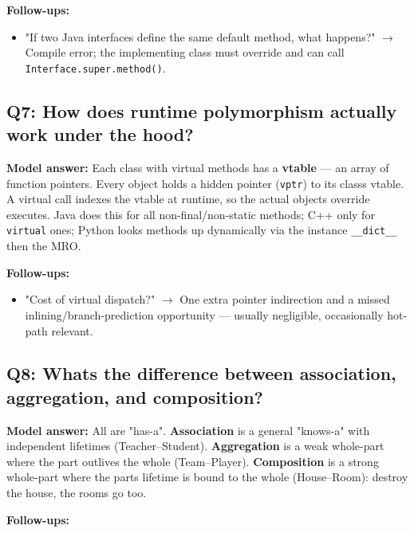 \documentclass[11pt]{article}
\providecommand{\tightlist}{\setlength{\itemsep}{1pt}\setlength{\parskip}{0pt}}
\begin{document}
\textbf{Follow-ups:}

\begin{itemize}
\tightlist
\item
  "If two Java interfaces define the same default method, what happens?" \(\rightarrow\) Compile error; the implementing class must override and can call \texttt{Interface.super.method()}.
\end{itemize}

\subsection{Q7: How does runtime polymorphism actually work under the hood?}\label{q7-how-does-runtime-polymorphism-actually-work-under-the-hood}

\textbf{Model answer:} Each class with virtual methods has a \textbf{vtable} --- an array of function pointers. Every object holds a hidden pointer (\texttt{vptr}) to its class\textquotesingle s vtable. A virtual call indexes the vtable at runtime, so the actual object\textquotesingle s override executes. Java does this for all non-final/non-static methods; C++ only for \texttt{virtual} ones; Python looks methods up dynamically via the instance \texttt{\_\_dict\_\_} then the MRO.

\textbf{Follow-ups:}

\begin{itemize}
\tightlist
\item
  "Cost of virtual dispatch?" \(\rightarrow\) One extra pointer indirection and a missed inlining/branch-prediction opportunity --- usually negligible, occasionally hot-path relevant.
\end{itemize}

\subsection{Q8: What\textquotesingle s the difference between association, aggregation, and composition?}\label{q8-whats-the-difference-between-association-aggregation-and-composition}

\textbf{Model answer:} All are "has-a". \textbf{Association} is a general "knows-a" with independent lifetimes (Teacher--Student). \textbf{Aggregation} is a weak whole-part where the part outlives the whole (Team--Player). \textbf{Composition} is a strong whole-part where the part\textquotesingle s lifetime is bound to the whole (House--Room): destroy the house, the rooms go too.

\textbf{Follow-ups:}
\end{document}
